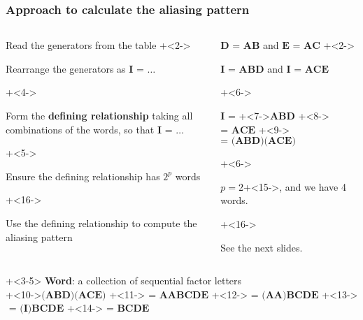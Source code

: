 \documentclass[handout,11pt,aspectratio=169,mathserif]{beamer}
\begin{document}
\begin{frame}\frametitle{Approach to calculate the aliasing pattern}
	
	\begin{columns}[T]
			\begin{enumerate}
				\item	Read the generators from the table 
				\onslide+<2->{
					\item	Rearrange the generators as  $\textbf{I = \ldots}$
				}
				\onslide+<4->{
				 	\item	Form the {\color{purple}\textbf{defining relationship}} taking all combinations of the words, so that $\textbf{I = \ldots}$
				}	
				\onslide+<5->{
				 	\item	Ensure the defining relationship has $2^p$ words
				}
				\onslide+<16->{
					\item	Use the defining relationship to compute the aliasing pattern
				}
			\end{enumerate}
			
		\column{0.5\textwidth}
			\begin{enumerate}
				\item	$\textbf{D = AB}$  and $\textbf{E = AC}$ 
				\onslide+<2->{
					\item	$\textbf{I = ABD}$ and $\textbf{I = ACE}$ 
				}
				
				\onslide+<6->{
 					\item	$\textbf{I =}$ \onslide+<7->{$\textbf{ABD}$} \onslide+<8->{$\textbf{= ACE}$} \onslide+<9->{$\textbf{= (ABD)(ACE)}$} 
					\\ \vspace{0.4cm}
				}
				\onslide+<6->{
								\item	$p=2$\onslide+<15->{, and we have 4 words.}
				}
				\onslide+<16->{
					\item	See the next slides.
					
				}
			\end{enumerate}			
			
	\end{columns}
	\vspace{0.5cm}
	\onslide+<3-5>{
		{\color{purple}\textbf{Word}}: a collection of sequential factor letters
	}
	\\
	\onslide+<10->{$\textbf{(ABD)(ACE)}$}
	\onslide+<11->{$\textbf{ = AABCDE}$}
	\onslide+<12->{$\textbf{ = (AA)BCDE}$}
	\onslide+<13->{$\textbf{ = (I)BCDE}$}
	\onslide+<14->{$\textbf{ = BCDE}$} 	
\end{frame}
\end{document}
